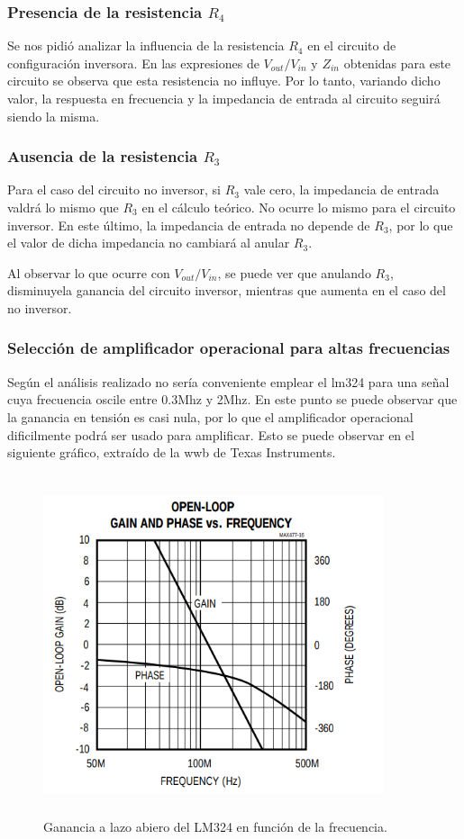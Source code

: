 \subsubsection{Presencia de la resistencia $R_4$}
Se nos pidi\'o analizar la influencia de la resistencia $R_4$ en el circuito de configuraci\'on inversora.
En las expresiones de $V_{out}/V_{in}$ y $Z_{in}$ obtenidas para este circuito se observa que
esta resistencia no influye. Por lo tanto, variando dicho valor, la respuesta en frecuencia y la impedancia
de entrada al circuito seguir\'a siendo la misma.

\subsubsection{Ausencia de la resistencia $R_3$}

Para el caso del circuito no inversor, si $R_3$ vale cero, la impedancia de entrada valdr\'a lo mismo 
que $R_3$ en el c\'alculo te\'orico. No ocurre lo mismo para el circuito inversor. En este \'ultimo, 
la impedancia de entrada no depende de $R_3$, por lo que el valor de dicha impedancia no cambiar\'a
al anular $R_3$.

Al observar lo que ocurre con $V_{out}/V_{in}$, se puede ver que anulando $R_3$, disminuyela ganancia del circuito inversor, mientras que aumenta en el caso del no inversor.

\subsubsection{Selecci\'on de amplificador operacional para altas frecuencias}
Según el análisis realizado no sería conveniente emplear el lm324 para una se\~nal cuya 
frecuencia oscile entre 0.3Mhz y 2Mhz. En este punto se puede observar que la ganancia 
en tensión es casi nula, por lo que el amplificador operacional dificilmente podrá ser usado 
para amplificar. Esto se puede observar en el siguiente gráfico, extraído de la wwb de Texas 
Instruments.

\begin{figure}[H] %
	\centering
	\includegraphics[width=10cm,height=10cm,keepaspectratio]{../EJ1/00GRAFICOS/imagenes/EJ1_avol_max477.png}
	\caption{Ganancia a lazo abiero del LM324 en funci\'on de la frecuencia.}
	\label{i1}
\end{figure}

